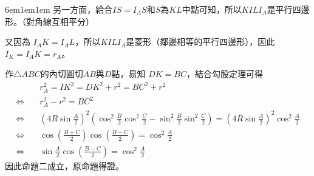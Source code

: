 \documentclass[12pt]{article}
\def\Ap{1em}
\begin{document}
\begin{mybox}[Answer]{6em}{1em}{\Ap}
    另一方面，給合$IS=I_AS$和$S$為$KL$中點可知，所以$KILI_A$是平行四邊形。（對角線互相平分）
    
    又因為 $I_AK=I_AL$，所以$KILI_A$是菱形（鄰邊相等的平行四邊形），因此$I_K=I_AK=r_A$。

    作$\triangle{ABC}$的內切圓切$AB$與$D$點，易知 $DK=BC$，結合勾股定理可得
    \begin{align*}
        &r_A^2=IK^2=DK^2+r^2=BC^2+r^2\\
        \Leftrightarrow\quad& r_A^2-r^2=BC^2\\
        \Leftrightarrow\quad& \left(4R\sin{\frac{A}{2}}\right)^2\left(\cos^2{\frac{B}{2}}\cos^2{\frac{C}{2}}
        -\sin^2{\frac{B}{2}}\sin^2{\frac{C}{2}}\right)=\left(4R\sin{\frac{A}{2}}\right)^2\cos^2{\frac{A}{2}}\\
        \Leftrightarrow\quad& \cos{\left(\frac{B+C}{2}\right)}\cos{\left(\frac{B-C}{2}\right)}=\cos^2{\frac{A}{2}}\\
        \Leftrightarrow\quad& \sin{\frac{A}{2}}\cos{\left(\frac{B-C}{2}\right)}=\cos^2{\frac{A}{2}}
    \end{align*}
    因此命題二成立，原命題得證。
\end{mybox}
\end{document}
